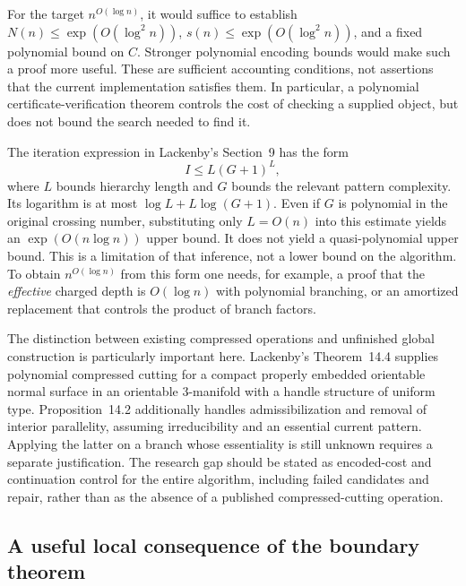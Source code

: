 \documentclass[11pt]{article}
\theoremstyle{definition}
\theoremstyle{remark}
\begin{document}
For the target $n^{O(\log n)}$, it would suffice to establish
$N(n)\le\exp(O(\log^2 n))$, $s(n)\le\exp(O(\log^2 n))$, and a fixed
polynomial bound on $C$. Stronger polynomial encoding bounds would make
such a proof more useful. These are sufficient accounting conditions,
not assertions that the current implementation satisfies them. In
particular, a polynomial certificate-verification theorem controls the
cost of checking a supplied object, but does not bound the search needed
to find it.

The iteration expression in Lackenby's Section~9 has the form
\begin{equation}\label{eq:lackenby-iterations}
 I\le L(G+1)^L,
\end{equation}
where $L$ bounds hierarchy length and $G$ bounds the relevant pattern
complexity. Its logarithm is at most
$\log L+L\log(G+1)$. Even if $G$ is polynomial in the original crossing
number, substituting only $L=O(n)$ into this estimate yields an
$\exp(O(n\log n))$ upper bound. It does not yield a quasi-polynomial
upper bound. This is a limitation of that inference, not a lower bound
on the algorithm. To obtain $n^{O(\log n)}$ from this form one needs,
for example, a proof that the \emph{effective} charged depth is
$O(\log n)$ with polynomial branching, or an amortized replacement that
controls the product of branch factors.

The distinction between existing compressed operations and unfinished
global construction is particularly important here. Lackenby's
Theorem~14.4 supplies polynomial compressed cutting for a compact properly
embedded orientable normal surface in an orientable 3-manifold with a
handle structure of uniform type. Proposition~14.2 additionally handles
admissibilization and removal of interior parallelity, assuming
irreducibility and an essential current pattern. Applying the latter on a branch whose
essentiality is still unknown requires a separate justification. The
research gap should be stated as encoded-cost and continuation control
for the entire algorithm, including failed candidates and repair, rather
than as the absence of a published compressed-cutting operation.

\subsection{A useful local consequence of the boundary theorem}
\end{document}

